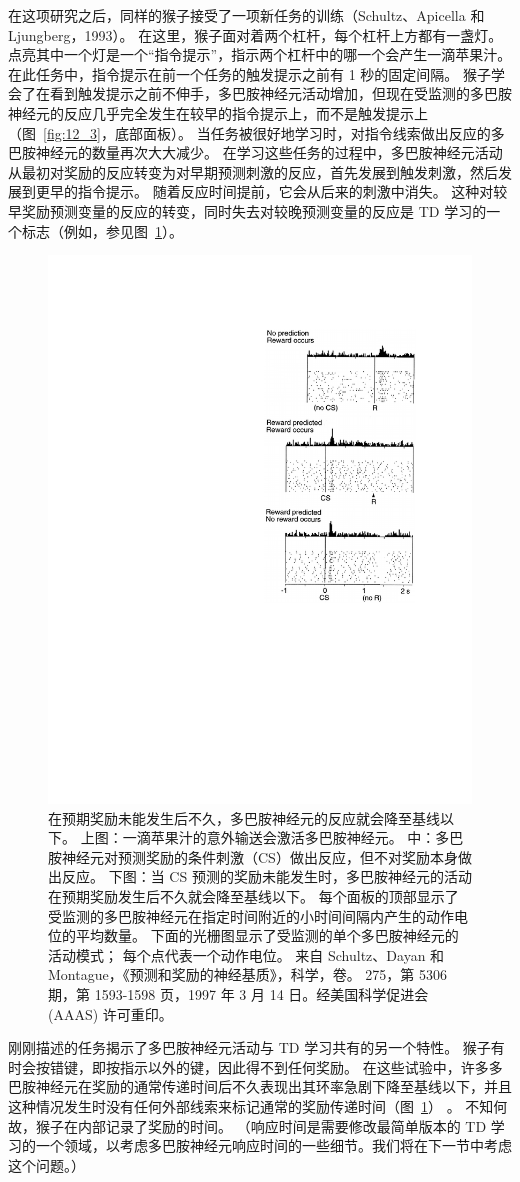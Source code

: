 {在这项研究之后，同样的猴子接受了一项新任务的训练（Schultz、Apicella 和 Ljungberg，1993）。
在这里，猴子面对着两个杠杆，每个杠杆上方都有一盏灯。
点亮其中一个灯是一个“指令提示”，指示两个杠杆中的哪一个会产生一滴苹果汁。
在此任务中，指令提示在前一个任务的触发提示之前有 1 秒的固定间隔。
猴子学会了在看到触发提示之前不伸手，多巴胺神经元活动增加，但现在受监测的多巴胺神经元的反应几乎完全发生在较早的指令提示上，而不是触发提示上（图~\ref{fig:12_3}，底部面板）。
当任务被很好地学习时，对指令线索做出反应的多巴胺神经元的数量再次大大减少。
在学习这些任务的过程中，多巴胺神经元活动从最初对奖励的反应转变为对早期预测刺激的反应，首先发展到触发刺激，然后发展到更早的指令提示。
随着反应时间提前，它会从后来的刺激中消失。
这种对较早奖励预测变量的反应的转变，同时失去对较晚预测变量的反应是 TD 学习的一个标志（例如，参见图~\ref{fig:12_4}）。


\begin{figure}[!htb]
	\centering
	\includegraphics[width=0.5\linewidth]{chap12/fig_12_4}
	\caption{在预期奖励未能发生后不久，多巴胺神经元的反应就会降至基线以下。
		上图：一滴苹果汁的意外输送会激活多巴胺神经元。
		中：多巴胺神经元对预测奖励的条件刺激（CS）做出反应，但不对奖励本身做出反应。
		下图：当 CS 预测的奖励未能发生时，多巴胺神经元的活动在预期奖励发生后不久就会降至基线以下。
		每个面板的顶部显示了受监测的多巴胺神经元在指定时间附近的小时间间隔内产生的动作电位的平均数量。
		下面的光栅图显示了受监测的单个多巴胺神经元的活动模式；
		每个点代表一个动作电位。
		来自 Schultz、Dayan 和 Montague，《预测和奖励的神经基质》，科学，卷。 275，第 5306 期，第 1593-1598 页，1997 年 3 月 14 日。经美国科学促进会 (AAAS) 许可重印。
		\label{fig:12_4}}
\end{figure}


刚刚描述的任务揭示了多巴胺神经元活动与 TD 学习共有的另一个特性。
猴子有时会按错键，即按指示以外的键，因此得不到任何奖励。
在这些试验中，许多多巴胺神经元在奖励的通常传递时间后不久表现出其环率急剧下降至基线以下，并且这种情况发生时没有任何外部线索来标记通常的奖励传递时间（图~\ref{fig:12_4}） 。
不知何故，猴子在内部记录了奖励的时间。
（响应时间是需要修改最简单版本的 TD 学习的一个领域，以考虑多巴胺神经元响应时间的一些细节。我们将在下一节中考虑这个问题。）


}
